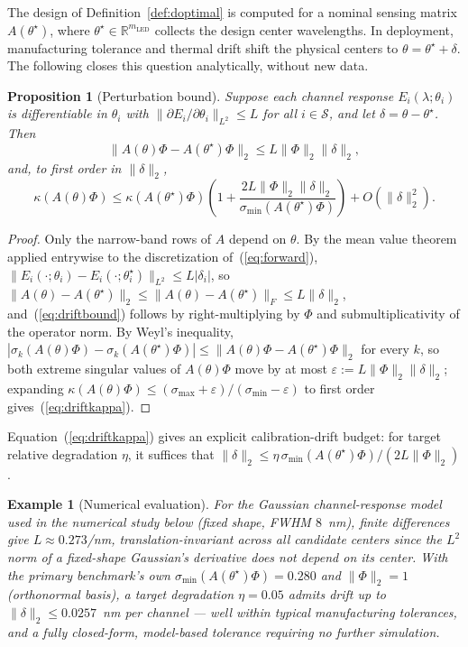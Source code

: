 \documentclass[11pt]{article}
\newtheorem{Proposition}{Proposition}
\newtheorem{Example}{Example}
\begin{document}
The design of Definition~\ref{def:doptimal} is computed for a nominal sensing matrix $A(\theta^\star)$, where $\theta^\star\in\mathbb{R}^{m_{\mathrm{LED}}}$ collects the design center wavelengths. In deployment, manufacturing tolerance and thermal drift shift the physical centers to $\theta=\theta^\star+\delta$. The following closes this question analytically, without new data.

\begin{Proposition}[Perturbation bound]
\label{prop:drift}
Suppose each channel response $E_i(\lambda;\theta_i)$ is differentiable in $\theta_i$ with $\|\partial E_i/\partial\theta_i\|_{L^2}\le L$ for all $i\in\mathcal{S}$, and let $\delta=\theta-\theta^\star$. Then
\begin{equation}
\|A(\theta)\Phi - A(\theta^\star)\Phi\|_2 \le L\|\Phi\|_2\|\delta\|_2,
\label{eq:driftbound}
\end{equation}
and, to first order in $\|\delta\|_2$,
\begin{equation}
\kappa(A(\theta)\Phi) \le \kappa(A(\theta^\star)\Phi)\left(1 + \frac{2L\|\Phi\|_2\|\delta\|_2}{\sigma_{\min}(A(\theta^\star)\Phi)}\right) + O(\|\delta\|_2^2).
\label{eq:driftkappa}
\end{equation}
\end{Proposition}
\begin{proof}
Only the narrow-band rows of $A$ depend on $\theta$. By the mean value theorem applied entrywise to the discretization of~(\ref{eq:forward}), $\|E_i(\cdot;\theta_i)-E_i(\cdot;\theta_i^\star)\|_{L^2}\le L|\delta_i|$, so $\|A(\theta)-A(\theta^\star)\|_2\le\|A(\theta)-A(\theta^\star)\|_F\le L\|\delta\|_2$, and~(\ref{eq:driftbound}) follows by right-multiplying by $\Phi$ and submultiplicativity of the operator norm. By Weyl's inequality, $|\sigma_k(A(\theta)\Phi)-\sigma_k(A(\theta^\star)\Phi)|\le\|A(\theta)\Phi-A(\theta^\star)\Phi\|_2$ for every $k$, so both extreme singular values of $A(\theta)\Phi$ move by at most $\varepsilon:=L\|\Phi\|_2\|\delta\|_2$; expanding $\kappa(A(\theta)\Phi)\le(\sigma_{\max}+\varepsilon)/(\sigma_{\min}-\varepsilon)$ to first order gives~(\ref{eq:driftkappa}).
\end{proof}

Equation~(\ref{eq:driftkappa}) gives an explicit calibration-drift budget: for target relative degradation $\eta$, it suffices that $\|\delta\|_2\le\eta\,\sigma_{\min}(A(\theta^\star)\Phi)/(2L\|\Phi\|_2)$.

\begin{Example}[Numerical evaluation]
\label{ex:drift-numeric}
For the Gaussian channel-response model used in the numerical study below (fixed shape, FWHM $8$~nm), finite differences give $L\approx0.273$/nm, translation-invariant across all candidate centers since the $L^2$ norm of a fixed-shape Gaussian's derivative does not depend on its center. With the primary benchmark's own $\sigma_{\min}(A(\theta^\star)\Phi)=0.280$ and $\|\Phi\|_2=1$ (orthonormal basis), a target degradation $\eta=0.05$ admits drift up to $\|\delta\|_2\le0.0257$~nm per channel --- well within typical manufacturing tolerances, and a fully closed-form, model-based tolerance requiring no further simulation.
\end{Example}
\end{document}
